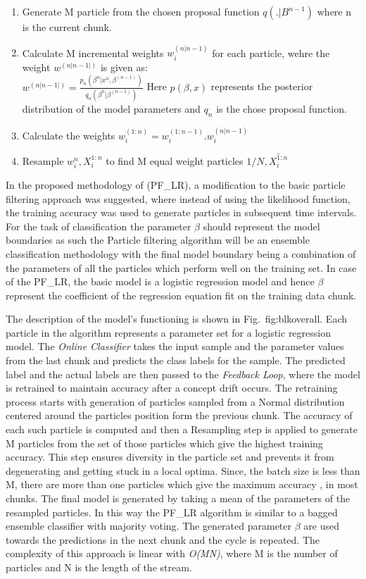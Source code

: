 \documentclass[conference]{IEEEtran}
\begin{document}
\begin{enumerate}
 \item  Generate M particle from the chosen proposal function $q(.|B^{n-1})$ where n is the current chunk. 
 \item Calculate M incremental weights $w_{i}^{(n|n-1)}$ for each particle, wehre the weight $w^{(n|n-1|)}$ is given as:\\
 $w^{(n|n-1|)}= \frac{p_n (\beta^n | x^n , \beta^{(n-1)})}{q_n(\beta^n|\beta^(n-1))}$ 
 Here $p(\beta,x)$ represents the posterior distribution of the model parameters and $q_n$ is the chose proposal function.
 \item Calculate the weights $w_{i}^{(1:n)} = w_{i}^{(1:n-1)} . w_{i}^{(n|n-1)}$
 \item Resample ${w_{i}^{n} , X_{i}^{1:n} }$ to find M equal weight particles ${1/N, \bar{X_i ^{1:n}}}$ 
\end{enumerate}

In the proposed methodology of \cite{pflr}(PF\_LR), a modification to the basic particle filtering approach was suggested, where instead of using the likelihood function, the training accuracy was used to generate particles in subsequent time intervals. For the task of classification the parameter $\beta$ should represent the model boundaries as such the Particle filtering algorithm will be an ensemble classification methodology with the final model boundary being a combination of the parameters of all the particles which perform well on the training set. In case of the PF\_LR, the basic model is a logistic regression model and hence $\beta$ represent the coefficient of the regression equation fit on the training data chunk. 


The description of the model's functioning is shown in Fig.~{fig:blkoverall}. Each particle in the algorithm represents a parameter set for a logistic regression model.  The \textit{Online Classifier} takes the input sample and the parameter values from the last chunk and predicts the class labels for the sample. The predicted label and the actual labels are then passed to the \textit{Feedback Loop}, where the model is retrained to maintain accuracy after a concept drift occurs. The retraining process starts with generation of particles sampled from a Normal distribution centered around the particles position form the previous chunk. The accuracy of each such particle is computed and then a Resampling step is applied to generate M particles from the set of those particles which give the highest training accuracy. This step ensures diversity in the particle set and prevents it from degenerating and getting stuck in a local optima. Since, the batch size is less than M, there are more than one particles which give  the maximum accuracy , in most chunks. The final model is generated by taking a mean of the parameters of the resampled particles. In this way the PF\_LR algorithm is similar to a bagged ensemble classifier with majority voting. The generated parameter $\beta$ are used towards the predictions in the next chunk and the cycle is repeated. The complexity of this approach is linear with \textit{O(MN)}, where M is the number of particles and N is the length of the stream. 
\end{document}
